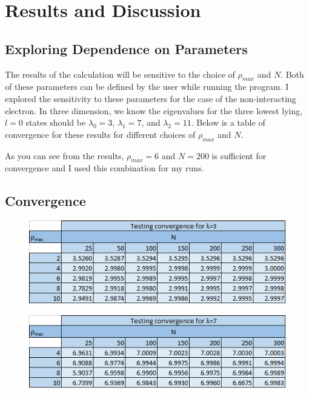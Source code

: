 \documentclass[%
oneside,                 %
final,                   %
10pt]{article}
\begin{document}
\section{Results and Discussion}


\subsection{Exploring Dependence on Parameters}

The results of the calculation will be sensitive to the choice of $\rho_{max}$ and $N$.  Both of these parameters can be defined by the user while running the program.  I explored the sensitivity to these parameters for the case of the non-interacting electron.  In three dimension, we know the eigenvalues for the three lowest lying, $l=0$ states should be $\lambda_0=3$, $\lambda_1=7$, and $\lambda_2=11$.  Below is a table of convergence for these results for different choices of  $\rho_{max}$ and $N$.

As you can see from the results, $\rho_{max}=6$ and $N=200$ is sufficient for convergence and I used this combination for my runs.

\subsection{Convergence}

\begin{figure}[H]\label{fig:3}
  \centering
    \includegraphics[width=1.1\textwidth]{3.png}
\end{figure}

\begin{figure}[H]\label{fig:7}
  \centering
    \includegraphics[width=1.1\textwidth]{7.png}
\end{figure}
\end{document}
